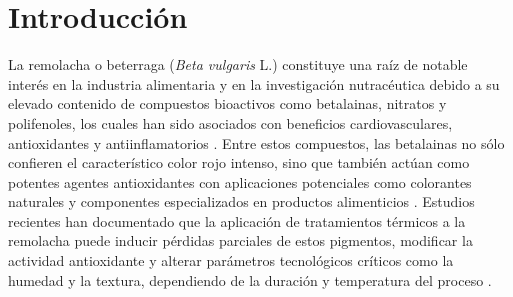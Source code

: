 \documentclass[manuscript,screen,review]{acmart}
\begin{document}



\maketitle
\section{Introducción}

    La remolacha o beterraga (\textit{Beta vulgaris} L.) constituye una raíz de notable interés en la industria alimentaria y en la investigación nutracéutica debido a su elevado contenido de compuestos bioactivos como betalainas, nitratos y polifenoles, los cuales han sido asociados con beneficios cardiovasculares, antioxidantes y antiinflamatorios \cite{Clifford2021,Siervo2016,WoottonBeard2011}. Entre estos compuestos, las betalainas no sólo confieren el característico color rojo intenso, sino que también actúan como potentes agentes antioxidantes con aplicaciones potenciales como colorantes naturales y componentes especializados en productos alimenticios \cite{Neelwarne2013,Montoya2011}. Estudios recientes han documentado que la aplicación de tratamientos térmicos a la remolacha puede inducir pérdidas parciales de estos pigmentos, modificar la actividad antioxidante y alterar parámetros tecnológicos críticos como la humedad y la textura, dependiendo de la duración y temperatura del proceso \cite{ArrudaRamos2017,Montoya2011}.
    
\end{document}
